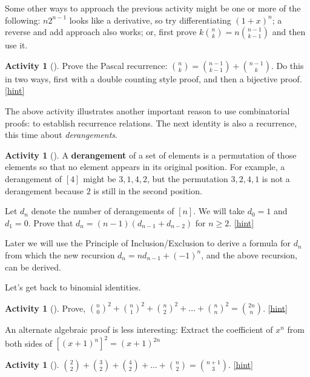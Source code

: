 \documentclass[10pt,]{book}
\newcommand{\terminology}[1]{\textbf{#1}}
\theoremstyle{plain}
\theoremstyle{definition}
\theoremstyle{definition}
\theoremstyle{definition}
\newtheorem{activity}[project]{Activity}
\numberwithin{equation}{chapter}
\begin{document}
\hypertarget{p-697}{}%
Some other ways to approach the previous activity might be one or more of the following: \(n2^{n - 1}\) looks like a derivative, so try differentiating \(\left( 1 + x \right)^{n}\); a reverse and add approach also works; or, first prove \(k \binom{n}{k} = n \binom{n - 1}{k - 1}\) and then use it.%
\begin{activity}[]\label{activity-92}
\hypertarget{p-698}{}%
Prove the Pascal recurrence: \(\binom{n}{k} = \binom{n - 1}{k-1} + \binom{n - 1}{k}\).  Do this in two ways, first with a double counting style proof, and then a bijective proof.%
\hfill{\tiny\hyperlink{a-99}{[hint]}\hypertarget{q-99}{}}\end{activity}
\hypertarget{p-701}{}%
The above activity illustrates another important reason to use combinatorial proofs: to establish recurrence relations.  The next identity is also a recurrence, this time about \emph{derangements}.%
\begin{activity}[]\label{activity-93}
\hypertarget{p-702}{}%
A \terminology{derangement} of a set of elements is a permutation of those elements so that no element appears in its original position.  For example, a derangement of \([4]\) might be \(3,1,4,2\), but the permutation \(3,2,4,1\) is not a derangement because \(2\) is still in the second position.%
\par
\hypertarget{p-703}{}%
Let \(d_{n}\) denote the number of derangements of \([n]\).  We will take \(d_{0} = 1\) and \(d_{1} = 0\).  Prove that \(d_{n} = (n - 1)(d_{n - 1}+ d_{n - 2})\) for \(n \geq 2\).%
\hfill{\tiny\hyperlink{a-100}{[hint]}\hypertarget{q-100}{}}\end{activity}
\hypertarget{p-706}{}%
Later we will use the Principle of Inclusion/Exclusion to derive a formula for \(d_{n}\) from which the new recursion \(d_{n} = nd_{n - 1} + \left( - 1 \right)^{n}\), and the above recursion, can be derived.%
\par
\hypertarget{p-707}{}%
Let's get back to binomial identities.%
\begin{activity}[]\label{activity-94}
\hypertarget{p-708}{}%
Prove, \(\binom{n}{0}^{2} + \binom{n}{1}^{2} + \binom{n}{2}^{2} + \ldots + \binom{n}{n}^{2} = \binom{2n}{n}\).%
\hfill{\tiny\hyperlink{a-101}{[hint]}\hypertarget{q-101}{}}\end{activity}
\hypertarget{p-711}{}%
An alternate algebraic proof is less interesting: Extract the coefficient of \(x^{n}\) from both sides of \(\left\lbrack \left( x + 1 \right)^{n} \right\rbrack^{2} = \left(x + 1 \right)^{2n}\)%
\begin{activity}[]\label{activity-95}
\hypertarget{p-712}{}%
\(\binom{2}{2} + \binom{3}{2} + \binom{4}{2} + \ldots + \binom{n}{2} = \binom{n + 1}{3}\).%
\hfill{\tiny\hyperlink{a-102}{[hint]}\hypertarget{q-102}{}}\end{activity}
\end{document}
